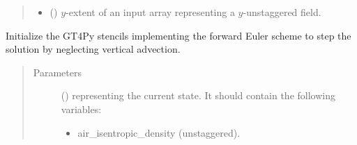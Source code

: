 \documentclass[letterpaper,10pt,english]{sphinxmanual}
\begin{document}
\begin{fulllineitems}
\begin{fulllineitems}
\begin{quote}
\begin{description}
\begin{itemize}
\item {} 
 () \textendash{} \(y\)-extent of an input array representing a \(y\)-unstaggered field.

\end{itemize}

\end{description}\end{quote}

\end{fulllineitems}


\begin{fulllineitems}
\label{\detokenize{api:dycore.prognostic_isentropic_forward_euler.PrognosticIsentropicForwardEuler._stencils_stepping_by_neglecting_vertical_advection_initialize}}
Initialize the GT4Py stencils implementing the forward Euler scheme to step the solution
by neglecting vertical advection.
\begin{quote}\begin{description}
\item[{Parameters}] \leavevmode
{} () \textendash{} 
{\hyperref[\detokenize{api:storages.state_isentropic.StateIsentropic}]{}} representing the current state.
It should contain the following variables:
\begin{itemize}
\item {} 
air\_isentropic\_density (unstaggered).

\end{itemize}


\end{description}\end{quote}

\end{fulllineitems}



\end{fulllineitems}
\end{document}
